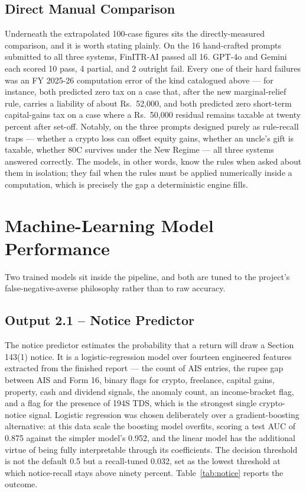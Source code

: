 \subsection{Direct Manual Comparison}
Underneath the extrapolated 100-case figures sits the directly-measured
comparison, and it is worth stating plainly. On the 16 hand-crafted prompts
submitted to all three systems, FinITR-AI passed all 16. GPT-4o and Gemini each
scored 10 pass, 4 partial, and 2 outright fail. Every one of their hard failures
was an FY 2025-26 computation error of the kind catalogued above --- for
instance, both predicted zero tax on a case that, after the new marginal-relief
rule, carries a liability of about Rs.~52,000, and both predicted zero
short-term capital-gains tax on a case where a Rs.~50,000 residual remains
taxable at twenty percent after set-off. Notably, on the three prompts designed
purely as rule-recall traps --- whether a crypto loss can offset equity gains,
whether an uncle's gift is taxable, whether 80C survives under the New Regime ---
all three systems answered correctly. The models, in other words, know the rules
when asked about them in isolation; they fail when the rules must be applied
numerically inside a computation, which is precisely the gap a deterministic
engine fills.

\section{Machine-Learning Model Performance}
\label{sec:result-set-2}

Two trained models sit inside the pipeline, and both are tuned to the project's
false-negative-averse philosophy rather than to raw accuracy.

\subsection{Output 2.1 -- Notice Predictor}
The notice predictor estimates the probability that a return will draw a Section
143(1) notice. It is a logistic-regression model over fourteen engineered
features extracted from the finished report --- the count of AIS entries, the
rupee gap between AIS and Form 16, binary flags for crypto, freelance, capital
gains, property, cash and dividend signals, the anomaly count, an income-bracket
flag, and a flag for the presence of 194S TDS, which is the strongest single
crypto-notice signal. Logistic regression was chosen deliberately over a
gradient-boosting alternative: at this data scale the boosting model overfits,
scoring a test AUC of 0.875 against the simpler model's 0.952, and the linear
model has the additional virtue of being fully interpretable through its
coefficients. The decision threshold is not the default 0.5 but a recall-tuned
0.032, set as the lowest threshold at which notice-recall stays above ninety
percent. Table~\ref{tab:notice} reports the outcome.

